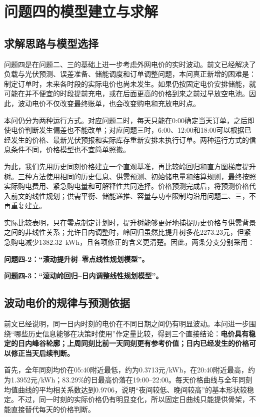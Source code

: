 \documentclass[11pt,a4paper]{article}
\begin{document}
\section{问题四的模型建立与求解}

\subsection{求解思路与模型选择}

问题四是在问题二、三的基础上进一步考虑外网电价的实时波动。前文已经解决了负载与光伏预测、误差准备、储能调度和订单调整问题，本问真正新增的困难是：制定订单时，未来各时段的实际电价也尚未发生。如果仍按固定电价安排储能，就可能在并不便宜的时段提前充电，或在后面更高的价格到来之前过早放空电池。因此，波动电价不仅改变最终账单，也会改变购电和充放电时点。

本问仍分为两种运行方式。对应问题二时，每天只能在0:00确定当天订单，之后即使电价判断发生偏差也不能改单；对应问题三时，6:00、12:00和18:00可以根据已经发生的价格、最新光伏预报和实际库存重新安排未执行订单。两种运行方式的信息条件不同，价格模型也不宜简单照搬。

为此，我们先用历史同刻价格建立一个直观基准，再比较岭回归和直方图梯度提升树。三种方法使用相同的历史信息、供需预测、初始储电量和结算规则，最终按照实际购电费用、紧急购电量和可解释性共同选择。价格预测完成后，将预测价格代入前文的线性规划；供需平衡、储能递推、容量与功率限制均沿用问题二、三，不再重复建立。

实际比较表明，只在零点制定计划时，提升树能够更好地捕捉历史价格与供需背景之间的非线性关系；允许日内调整时，岭回归虽然比提升树多花2273.23元，但紧急购电减少1382.32~kWh，且各项修正的含义更清楚。因此，两条分支分别采用：

\textbf{问题四-2：“滚动提升树--零点线性规划模型”。}

\textbf{问题四-3：“滚动岭回归--日内调整线性规划模型”。}

\subsection{波动电价的规律与预测依据}

前文已经说明，同一日内时刻的电价在不同日期之间仍有明显波动。本问进一步围绕“哪些历史信息能够在决策时使用”作定量比较，得到三个直接结论：\textbf{电价具有稳定的日内峰谷轮廓；上周同刻比前一天同刻更有参考价值；日内已经发生的价格可以修正当天后续判断。}

首先，全年同刻均价在05:40附近最低，约为0.3713元/kWh，在20:40附近最高，约为1.3952元/kWh；83.29\%的日最高价落在19:00--22:00。每天价格曲线与全年同刻均值曲线的平均相关系数达到0.9706，说明“夜间较低、晚间较高”的基本形状较稳定。不过，同一时刻的实际价格仍有明显变化，所以固定日曲线只能提供骨架，不能直接替代每天的价格判断。
\end{document}
